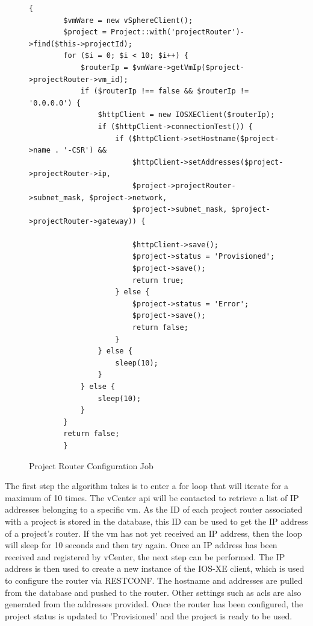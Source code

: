 \begin{figure}[H]
    \begin{lstlisting}[basicstyle=\scriptsize]
        {
        $vmWare = new vSphereClient();
        $project = Project::with('projectRouter')->find($this->projectId);
        for ($i = 0; $i < 10; $i++) {
            $routerIp = $vmWare->getVmIp($project->projectRouter->vm_id);
            if ($routerIp !== false && $routerIp != '0.0.0.0') {
                $httpClient = new IOSXEClient($routerIp);
                if ($httpClient->connectionTest()) {
                    if ($httpClient->setHostname($project->name . '-CSR') &&
                        $httpClient->setAddresses($project->projectRouter->ip,
                        $project->projectRouter->subnet_mask, $project->network,
                        $project->subnet_mask, $project->projectRouter->gateway)) {

                        $httpClient->save();
                        $project->status = 'Provisioned';
                        $project->save();
                        return true;
                    } else {
                        $project->status = 'Error';
                        $project->save();
                        return false;
                    }
                } else {
                    sleep(10);
                }
            } else {
                sleep(10);
            }
        }
        return false;
        }
    \end{lstlisting}
    \caption{Project Router Configuration Job}
    \label{fig:project-router-configuration-job}
\end{figure}

The first step the algorithm takes is to enter a for loop that will iterate for a maximum of 10 times. The vCenter \gls{api} will be contacted to retrieve a list of IP addresses belonging to a specific \gls{vm}. As the ID of each project router associated with a project is stored in the database, this ID can be used to get the IP address of a project's router. If the \gls{vm} has not yet received an IP address, then the loop will sleep for 10 seconds and then try again. Once an IP address has been received and registered by vCenter, the next step can be performed. The IP address is then used to create a new instance of the IOS-XE client, which is used to configure the router via RESTCONF. The hostname and addresses are pulled from the database and pushed to the router. Other settings such as \gls{acl}s are also generated from the addresses provided. Once the router has been configured, the project status is updated to 'Provisioned' and the project is ready to be used.